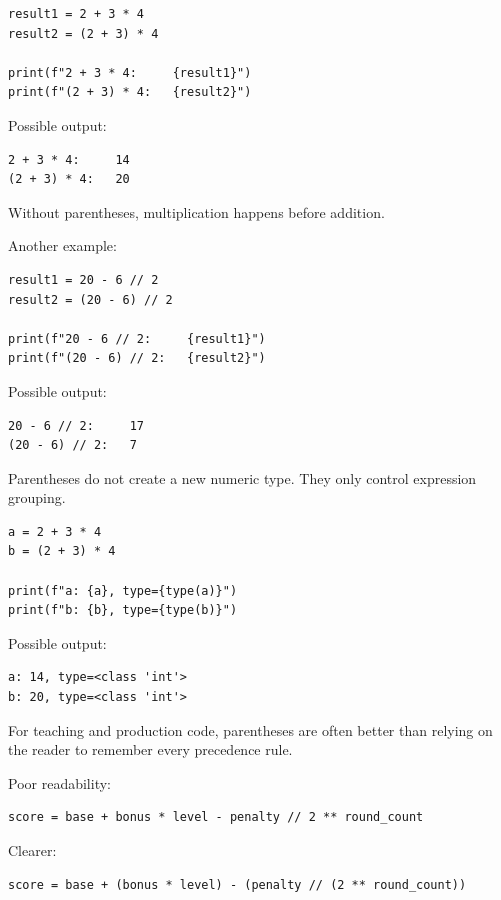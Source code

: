 \begin{verbatim}
result1 = 2 + 3 * 4
result2 = (2 + 3) * 4

print(f"2 + 3 * 4:     {result1}")
print(f"(2 + 3) * 4:   {result2}")
\end{verbatim}

Possible output:

\begin{verbatim}
2 + 3 * 4:     14
(2 + 3) * 4:   20
\end{verbatim}

Without parentheses, multiplication happens before addition.

Another example:

\begin{verbatim}
result1 = 20 - 6 // 2
result2 = (20 - 6) // 2

print(f"20 - 6 // 2:     {result1}")
print(f"(20 - 6) // 2:   {result2}")
\end{verbatim}

Possible output:

\begin{verbatim}
20 - 6 // 2:     17
(20 - 6) // 2:   7
\end{verbatim}

Parentheses do not create a new numeric type. They only control expression grouping.

\begin{verbatim}
a = 2 + 3 * 4
b = (2 + 3) * 4

print(f"a: {a}, type={type(a)}")
print(f"b: {b}, type={type(b)}")
\end{verbatim}

Possible output:

\begin{verbatim}
a: 14, type=<class 'int'>
b: 20, type=<class 'int'>
\end{verbatim}

For teaching and production code, parentheses are often better than relying on the reader to remember every precedence rule.

Poor readability:

\begin{verbatim}
score = base + bonus * level - penalty // 2 ** round_count
\end{verbatim}

Clearer:

\begin{verbatim}
score = base + (bonus * level) - (penalty // (2 ** round_count))
\end{verbatim}

